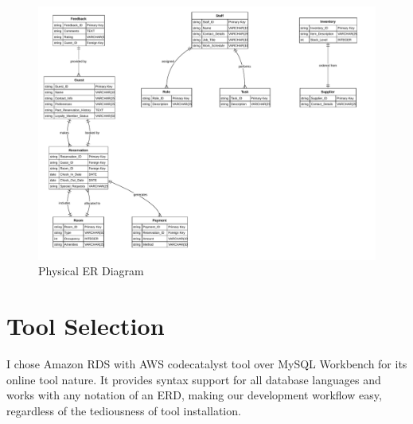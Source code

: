 \documentclass{article}
\begin{document}
\newpage


\begin{figure}[h]
\centering
\includegraphics[width=\textwidth]{physical_erd.pdf}
\caption{Physical ER Diagram}
\end{figure}

\newpage


\section*{Tool Selection}
I chose Amazon RDS with AWS codecatalyst tool over MySQL Workbench for its online tool nature. It provides syntax support for all database languages and works with any notation of an ERD, making our development workflow easy, regardless of the tediousness of tool installation.
\end{document}
